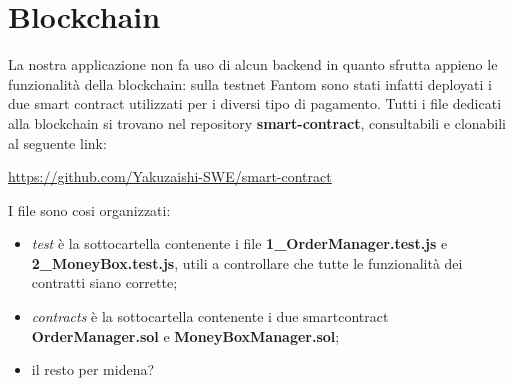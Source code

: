 \section{Blockchain}\label{section:blockchain}

La nostra applicazione non fa uso di alcun backend in quanto sfrutta appieno le funzionalità della blockchain: 
sulla testnet Fantom sono stati infatti deployati i due smart contract utilizzati per i diversi tipo di pagamento.
Tutti i file dedicati alla blockchain si trovano nel repository \textbf{smart-contract}, consultabili e clonabili al seguente link:

\begin{center}
    \href{https://github.com/Yakuzaishi-SWE/smart-contract}{https://github.com/Yakuzaishi-SWE/smart-contract}
\end{center}

I file sono cosi organizzati:
\begin{itemize}
    \item \textit{test} è la sottocartella contenente i file \textbf{1\_OrderManager.test.js} e \textbf{2\_MoneyBox.test.js}, utili a controllare che tutte le funzionalità dei contratti siano corrette;
    \item \textit{contracts} è la sottocartella contenente i due smartcontract \textbf{OrderManager.sol} e \textbf{MoneyBoxManager.sol};
    \item il resto per midena?
\end{itemize}